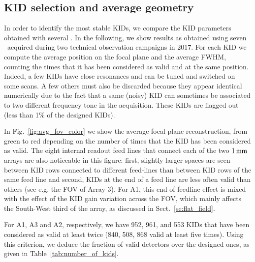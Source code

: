 \subsection{KID selection and average geometry}
\label{se:avg_kidpar}

In order to identify the most stable KIDs, we compare the KID parameters
obtained with several \bms.  In the following, we show results as obtained using
seven \bms\ acquired during two technical observation campaigns in
2017.
For each KID we
compute the average position on the focal plane and the average FWHM, counting
the times that it has been considered as valid and at the same position. Indeed,
a few KIDs have close resonances and can be tuned and switched on some scans. A
few others must also be discarded because they appear identical numerically due
to the fact that a same (noisy) KID can sometimes be associated
to two different frequency tone in the acquisition.
These KIDs are flagged out (less than 1\% of the designed KIDs).

In Fig.~\ref{fig:avg_fov_color} we show the
average focal plane reconstruction, from green to red depending on the number of
times that the KID has been considered as valid.
The eight internal readout feed lines that connect each of the two
$1\,\rm{mm}$ arrays are also noticeable in this figure: first, slightly
larger spaces are seen between KID rows connected to different
feed-lines than between KID rows of the same feed line and second, KIDs at the end of a
feed line are less often valid than others (see e.g. the FOV of
Array 3). For A1, this end-of-feedline effect is mixed with the
effect of the KID gain variation across the FOV, which mainly affects
the South-West third of the array, as discussed in Sect.~\ref{se:flat_field}.

For A1, A3 and A2, respectively, we have 952, 961, and 553 KIDs that
have been considered as valid at least twice (840, 508, 868 valid at
least five times). Using this criterion, we deduce the fraction of
valid detectors over the designed ones, as given in Table~\ref{tab:number_of_kids}.


